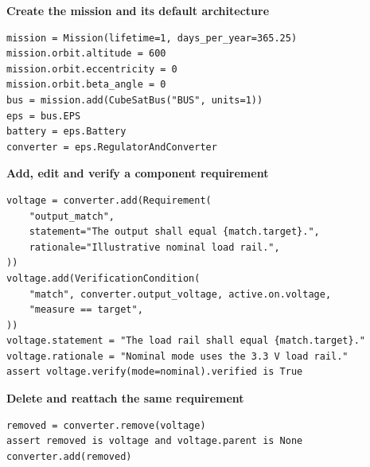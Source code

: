 \documentclass[border=5pt]{standalone}
\begin{document}
\begin{minipage}{510pt}
\fontsize{10}{12}\selectfont
\begin{minipage}[t]{506pt}
\vspace{0pt}\textbf{Create the mission and its default architecture}\par\smallskip
\begin{lstlisting}[style=report-python,basicstyle=\ttfamily\fontsize{8.5}{10.88}\selectfont]
mission = Mission(lifetime=1, days_per_year=365.25)
mission.orbit.altitude = 600
mission.orbit.eccentricity = 0
mission.orbit.beta_angle = 0
bus = mission.add(CubeSatBus("BUS", units=1))
eps = bus.EPS
battery = eps.Battery
converter = eps.RegulatorAndConverter
\end{lstlisting}
\end{minipage}\par\medskip\begin{minipage}[t]{506pt}
\vspace{0pt}\textbf{Add, edit and verify a component requirement}\par\smallskip
\begin{lstlisting}[style=report-python,basicstyle=\ttfamily\fontsize{8.5}{10.88}\selectfont]
voltage = converter.add(Requirement(
    "output_match",
    statement="The output shall equal {match.target}.",
    rationale="Illustrative nominal load rail.",
))
voltage.add(VerificationCondition(
    "match", converter.output_voltage, active.on.voltage,
    "measure == target",
))
voltage.statement = "The load rail shall equal {match.target}."
voltage.rationale = "Nominal mode uses the 3.3 V load rail."
assert voltage.verify(mode=nominal).verified is True
\end{lstlisting}
\end{minipage}\par\medskip\begin{minipage}[t]{506pt}
\vspace{0pt}\textbf{Delete and reattach the same requirement}\par\smallskip
\begin{lstlisting}[style=report-python,basicstyle=\ttfamily\fontsize{8.5}{10.88}\selectfont]
removed = converter.remove(voltage)
assert removed is voltage and voltage.parent is None
converter.add(removed)
\end{lstlisting}
\end{minipage}
\end{minipage}
\end{document}
